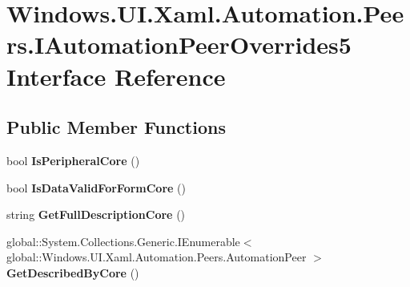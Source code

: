 \hypertarget{interface_windows_1_1_u_i_1_1_xaml_1_1_automation_1_1_peers_1_1_i_automation_peer_overrides5}{}\section{Windows.\+U\+I.\+Xaml.\+Automation.\+Peers.\+I\+Automation\+Peer\+Overrides5 Interface Reference}
\label{interface_windows_1_1_u_i_1_1_xaml_1_1_automation_1_1_peers_1_1_i_automation_peer_overrides5}
\subsection*{Public Member Functions}
\begin{DoxyCompactItemize}
\item 
\mbox{\label{interface_windows_1_1_u_i_1_1_xaml_1_1_automation_1_1_peers_1_1_i_automation_peer_overrides5_ae3adfbb55905d7d2ff9ead0e1a6ae6a2}} 
bool {\bfseries Is\+Peripheral\+Core} ()
\item 
\mbox{\label{interface_windows_1_1_u_i_1_1_xaml_1_1_automation_1_1_peers_1_1_i_automation_peer_overrides5_a78142ee2e5244e2fbb9216d54143bf43}} 
bool {\bfseries Is\+Data\+Valid\+For\+Form\+Core} ()
\item 
\mbox{\label{interface_windows_1_1_u_i_1_1_xaml_1_1_automation_1_1_peers_1_1_i_automation_peer_overrides5_ae4fe16606bf1afc7f1452aec94e74f1a}} 
string {\bfseries Get\+Full\+Description\+Core} ()
\item 
\mbox{\label{interface_windows_1_1_u_i_1_1_xaml_1_1_automation_1_1_peers_1_1_i_automation_peer_overrides5_a22cd781a868a550b1baa7366dcac101b}} 
global\+::\+System.\+Collections.\+Generic.\+I\+Enumerable$<$ global\+::\+Windows.\+U\+I.\+Xaml.\+Automation.\+Peers.\+Automation\+Peer $>$ {\bfseries Get\+Described\+By\+Core} ()
\item 
\mbox{\label{interface_windows_1_1_u_i_1_1_xaml_1_1_automation_1_1_peers_1_1_i_automation_peer_overrides5_aae43fba3e3aa03268f906c31c86a1dfd}} 

\end{DoxyCompactItemize}

